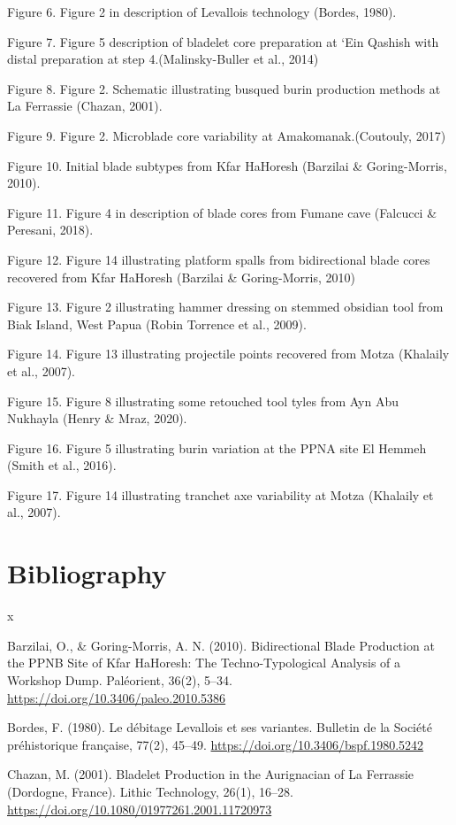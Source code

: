 \documentclass[
]{article}
\begin{document}
Figure 6. Figure 2 in description of Levallois technology (Bordes,
1980).

Figure 7. Figure 5 description of bladelet core preparation at `Ein
Qashish with distal preparation at step 4.(Malinsky-Buller et al., 2014)

Figure 8. Figure 2. Schematic illustrating busqued burin production
methods at La Ferrassie (Chazan, 2001).

Figure 9. Figure 2. Microblade core variability at Amakomanak.(Coutouly,
2017)

Figure 10. Initial blade subtypes from Kfar HaHoresh (Barzilai \&
Goring-Morris, 2010).

Figure 11. Figure 4 in description of blade cores from Fumane cave
(Falcucci \& Peresani, 2018).

Figure 12. Figure 14 illustrating platform spalls from bidirectional
blade cores recovered from Kfar HaHoresh (Barzilai \& Goring-Morris,
2010)

Figure 13. Figure 2 illustrating hammer dressing on stemmed obsidian
tool from Biak Island, West Papua (Robin Torrence et al., 2009).

Figure 14. Figure 13 illustrating projectile points recovered from Motza
(Khalaily et al., 2007).

Figure 15. Figure 8 illustrating some retouched tool tyles from Ayn Abu
Nukhayla (Henry \& Mraz, 2020).

Figure 16. Figure 5 illustrating burin variation at the PPNA site El
Hemmeh (Smith et al., 2016).

Figure 17. Figure 14 illustrating tranchet axe variability at Motza
(Khalaily et al., 2007).

\hypertarget{bibliography}{%
\section{Bibliography}\label{bibliography}}

x

Barzilai, O., \& Goring-Morris, A. N. (2010). Bidirectional Blade
Production at the PPNB Site of Kfar HaHoresh: The Techno-Typological
Analysis of a Workshop Dump. Paléorient, 36(2), 5--34.
\url{https://doi.org/10.3406/paleo.2010.5386}

Bordes, F. (1980). Le débitage Levallois et ses variantes. Bulletin de
la Société préhistorique française, 77(2), 45--49.
\url{https://doi.org/10.3406/bspf.1980.5242}

Chazan, M. (2001). Bladelet Production in the Aurignacian of La
Ferrassie (Dordogne, France). Lithic Technology, 26(1), 16--28.
\url{https://doi.org/10.1080/01977261.2001.11720973}
\end{document}
